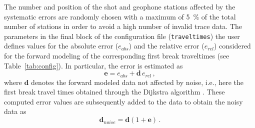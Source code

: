 \documentclass[a4paper,fleqn]{cas-sc}
\newcommand{\vecmat}[1]{\bm #1}
\begin{document}
The number and position of the shot and geophone stations affected by the systematic errors are randomly chosen with a maximum of \qty{5}{\%} of the total number of stations in order to avoid a high number of invalid trace data.
The parameters in the final block of the configuration file (\texttt{traveltimes}) the user defines values for the absolute error ($e_{abs}$) and the relative error ($e_{rel}$) considered for the forward modeling of the corresponding first break traveltimes (see Table~\ref{tab:config}). In particular, the error is estimated as
\begin{equation}
	\vecmat{e} = e_{abs} + \vecmat{d}\,e_{rel}\,, 
	\label{eq:esterr}
\end{equation}
where $\vecmat{d}$ denotes the forward modeled data not affected by noise, i.e., here the first break travel times obtained through the Dijkstra algorithm \citep{dijkstra1959}. These computed error values are subsequently added to the data to obtain the noisy data as
\begin{equation}
	\vecmat{d_{noise}}=\vecmat{d}\left(1 + \vecmat{e}\right)\,.
	\label{eq:noisydata}
\end{equation}
\end{document}
